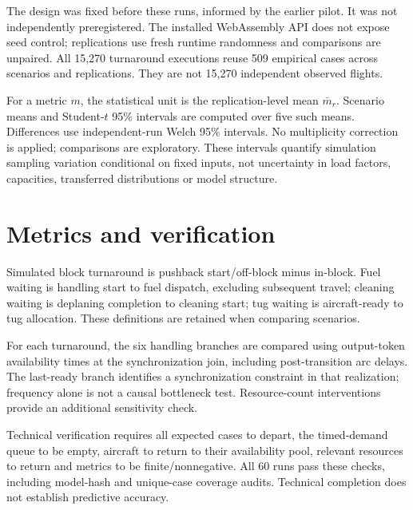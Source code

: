 The design was fixed before these runs, informed by the earlier pilot. It was not independently preregistered. The installed WebAssembly API does not expose seed control; replications use fresh runtime randomness and comparisons are unpaired. All 15,270 turnaround executions reuse 509 empirical cases across scenarios and replications. They are not 15,270 independent observed flights.

For a metric $m$, the statistical unit is the replication-level mean $\bar m_r$. Scenario means and Student-$t$ 95\% intervals are computed over five such means. Differences use independent-run Welch 95\% intervals. No multiplicity correction is applied; comparisons are exploratory. These intervals quantify simulation sampling variation conditional on fixed inputs, not uncertainty in load factors, capacities, transferred distributions or model structure.

\section{Metrics and verification}
Simulated block turnaround is pushback start/off-block minus in-block. Fuel waiting is handling start to fuel dispatch, excluding subsequent travel; cleaning waiting is deplaning completion to cleaning start; tug waiting is aircraft-ready to tug allocation. These definitions are retained when comparing scenarios.

For each turnaround, the six handling branches are compared using output-token availability times at the synchronization join, including post-transition arc delays. The last-ready branch identifies a synchronization constraint in that realization; frequency alone is not a causal bottleneck test. Resource-count interventions provide an additional sensitivity check.

Technical verification requires all expected cases to depart, the timed-demand queue to be empty, aircraft to return to their availability pool, relevant resources to return and metrics to be finite/nonnegative. All 60 runs pass these checks, including model-hash and unique-case coverage audits. Technical completion does not establish predictive accuracy.
